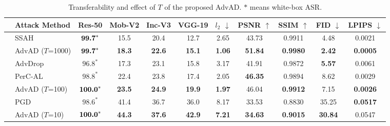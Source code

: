 \documentclass{article}
\begin{document}
\begin{table}[t]
    \caption{Transferability and effect of $T$ of the proposed AdvAD. $*$ means white-box ASR. }
    \label{tab:tab3}
    \centering
    {
    \setlength{\tabcolsep}{5.3pt}
    \scriptsize\begin{tabular}{clccccccccc}
        \toprule
            & Attack Method     & Res-50    & Mob-V2    & Inc-V3    & VGG-19    & $l_2$ $\downarrow$    & \;PSNR $\uparrow$     & \;SSIM $\uparrow$     & \;FID $\downarrow$    & \;LPIPS $\downarrow$    \\
        \midrule
              & SSAH \cite{luo2022frequency}              & $\text{\textbf{99.7}}^*$      & 15.5      & 20.4      & 12.7      & 2.65      & 43.73     & 0.9911    & 4.48      & 0.0021 \\
                                                & AdvAD ($T$=1000)    & $\text{\textbf{99.7}}^*$      & \textbf{18.3}      & \textbf{22.6}      & \textbf{15.1}      & \textbf{1.06}      & \textbf{51.84}     & \textbf{0.9980}    & \textbf{2.42}      & \textbf{0.0005} \\
        \cmidrule(lr){2-11}
                                                & AdvDrop \cite{duan2021advdrop}           & $\text{96.8}^*$      & 17.3      & 23.1      & 15.8      & 3.17      & 41.91     & 0.9872    & \textbf{5.57}      & 0.0061 \\
                                                & PerC-AL \cite{zhao2020towards}           & $\text{98.8}^*$      & 22.4      & 23.8      & 17.4      & 2.05      & \textbf{46.35}     & 0.9894    & 8.62      & 0.0029 \\
                                                & AdvAD ($T$=100)     & $\text{\textbf{100.0}}^*$     & \textbf{23.5}      & \textbf{24.9}      & \textbf{19.9}      & \textbf{1.97}      & 46.04     & \textbf{0.9912}    & 7.15      & \textbf{0.0026} \\
        \cmidrule(lr){2-11}                                        
                                                & PGD \cite{madry2018towards}               & $\text{98.6}^*$      & 41.4      & 36.7      & 36.0      & 8.17      & 33.53     & 0.8830    & 35.25     & \textbf{0.0517} \\
                                                & AdvAD ($T$=10)      & $\text{\textbf{100.0}}^*$     & \textbf{44.3}      & \textbf{37.6}      & \textbf{42.9}      & \textbf{7.21}      & \textbf{34.63}     & \textbf{0.9015}    & \textbf{30.84}     & 0.0547 \\

\end{tabular}}
\end{table}
\end{document}
